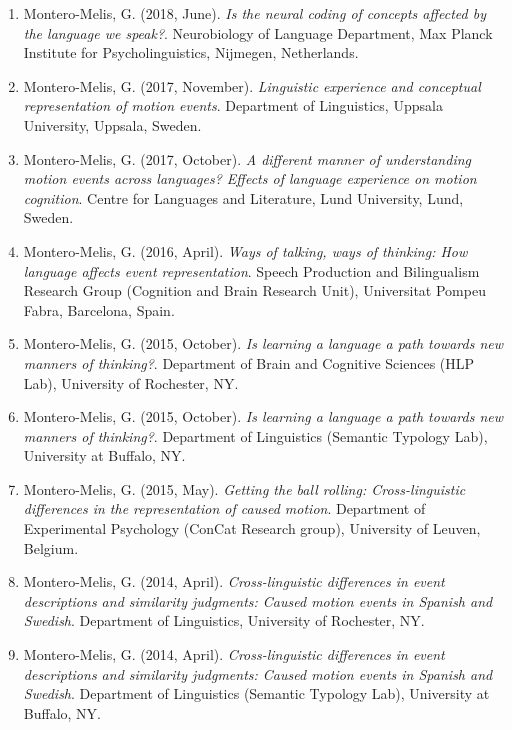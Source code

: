 \documentclass[margin, 11pt]{res} %
\begin{document}
\begin{resume}
\begin{enumerate}

\item Montero-Melis, G. (2018, June). \textit{Is the neural coding of concepts affected by the language we speak?}. Neurobiology of Language Department, Max Planck Institute for Psycholinguistics, Nijmegen, Netherlands.

\item Montero-Melis, G. (2017, November). \textit{Linguistic experience and conceptual representation of motion events}. Department of Linguistics, Uppsala University, Uppsala, Sweden.

\item Montero-Melis, G. (2017, October). \textit{A different manner of understanding motion events across languages? Effects of language experience on motion cognition}. Centre for Languages and Literature, Lund University, Lund, Sweden.

\item Montero-Melis, G. (2016, April). \textit{Ways of talking, ways of thinking: How language affects event representation}. Speech Production and Bilingualism Research Group (Cognition and Brain Research Unit), Universitat Pompeu Fabra, Barcelona, Spain.

\item Montero-Melis, G. (2015, October). \textit{Is learning a language a path towards new manners of thinking?}. Department of Brain and Cognitive Sciences (HLP Lab), University of Rochester, NY.

\item Montero-Melis, G. (2015, October). \textit{Is learning a language a path towards new manners of thinking?}. Department of Linguistics (Semantic Typology Lab), University at Buffalo, NY.

\item Montero-Melis, G. (2015, May). \textit{Getting the ball rolling: Cross-linguistic differences in the representation of caused motion}. Department of Experimental Psychology (ConCat Research group), University of Leuven, Belgium.

\item Montero-Melis, G. (2014, April). \textit{Cross-linguistic differences in event descriptions and similarity judgments: Caused motion events in Spanish and Swedish}. Department of Linguistics, University of Rochester, NY.

\item Montero-Melis, G. (2014, April). \textit{Cross-linguistic differences in event descriptions and similarity judgments: Caused motion events in Spanish and Swedish}. Department of Linguistics (Semantic Typology Lab), University at Buffalo, NY.


\end{enumerate}
\end{resume}
\end{document}
